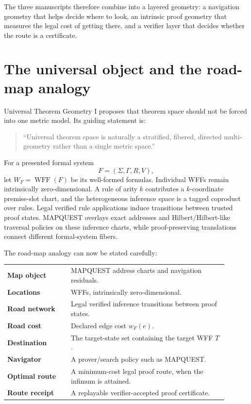 \documentclass[11pt]{article}
\theoremstyle{definition}
\theoremstyle{remark}
\newcommand{\WFF}{\operatorname{WFF}}
\begin{document}
The three manuscripts therefore combine into a layered geometry: a navigation geometry that helps decide where to look, an intrinsic proof geometry that measures the legal cost of getting there, and a verifier layer that decides whether the route is a certificate.

\section{The universal object and the road-map analogy}

Universal Theorem Geometry I proposes that theorem space should not be forced into one metric model. Its guiding statement is:

\begin{quote}
``Universal theorem space is naturally a stratified, fibered, directed multi-geometry rather than a single metric space.'' \cite{UTGI}
\end{quote}

For a presented formal system
\[
F=(\Sigma,\Gamma,R,V),
\]
let $W_F=\WFF(F)$ be its well-formed formulas. Individual WFFs remain intrinsically zero-dimensional. A rule of arity $k$ contributes a $k$-coordinate premise-slot chart, and the heterogeneous inference space is a tagged coproduct over rules. Legal verified rule applications induce transitions between trusted proof states. MAPQUEST overlays exact addresses and Hilbert/Hilbert-like traversal policies on these inference charts, while proof-preserving translations connect different formal-system fibers.

The road-map analogy can now be stated carefully:
\begin{center}
\begin{tabular}{>{\bfseries}p{0.26\linewidth}p{0.64\linewidth}}
Map object & MAPQUEST address charts and navigation residuals.\\
Locations & WFFs, intrinsically zero-dimensional.\\
Road network & Legal verified inference transitions between proof states.\\
Road cost & Declared edge cost $w_F(e)$.\\
Destination & The target-state set containing the target WFF $T$.\\
Navigator & A prover/search policy such as MAPQUEST.\\
Optimal route & A minimum-cost legal proof route, when the infimum is attained.\\
Route receipt & A replayable verifier-accepted proof certificate.\\
\end{tabular}
\end{center}
\end{document}
